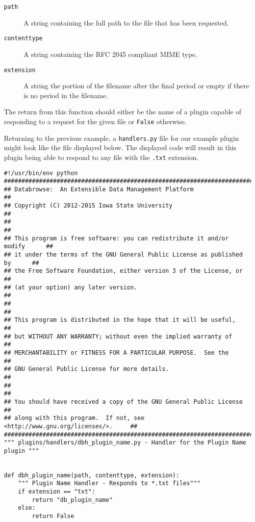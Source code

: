 \documentclass[10pt]{article}
\begin{document}
\begin{description}
	\item[\texttt{path}] A string containing the full path to the file that has been requested.
	\item[\texttt{contenttype}] A string containing the RFC 2045 compliant MIME type.
	\item[\texttt{extension}] A string the portion of the filename after the final period or empty if there is no period in the filename.
\end{description}

The return from this function should either be the name of a plugin capable of responding to a request for the given file or \texttt{False} otherwise.

Returning to the previous example, a \texttt{handlers.py} file for our example plugin might look like the file displayed below.  The displayed code will result in this plugin being able to respond to any file with the \texttt{.txt} extension.

\begin{lstlisting}
#!/usr/bin/env python
###############################################################################
## Databrowse:  An Extensible Data Management Platform                       ##
## Copyright (C) 2012-2015 Iowa State University                             ##
##                                                                           ##
## This program is free software: you can redistribute it and/or modify      ##
## it under the terms of the GNU General Public License as published by      ##
## the Free Software Foundation, either version 3 of the License, or         ##
## (at your option) any later version.                                       ##
##                                                                           ##
## This program is distributed in the hope that it will be useful,           ##
## but WITHOUT ANY WARRANTY; without even the implied warranty of            ##
## MERCHANTABILITY or FITNESS FOR A PARTICULAR PURPOSE.  See the             ##
## GNU General Public License for more details.                              ##
##                                                                           ##
## You should have received a copy of the GNU General Public License         ##
## along with this program.  If not, see <http://www.gnu.org/licenses/>.     ##
###############################################################################
""" plugins/handlers/dbh_plugin_name.py - Handler for the Plugin Name plugin """


def dbh_plugin_name(path, contenttype, extension):
    """ Plugin Name Handler - Responds to *.txt files"""
    if extension == "txt":
        return "db_plugin_name"
    else:
        return False
\end{lstlisting}
\end{document}
